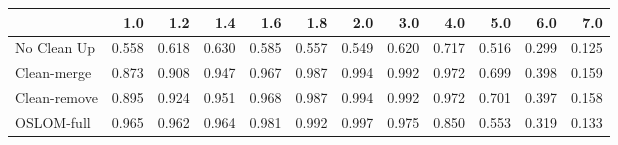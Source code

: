 \begin{tabular}{lrrrrrrrrrrr}
\toprule
{} &   1.0 &   1.2 &   1.4 &   1.6 &   1.8 &   2.0 &   3.0 &   4.0 &   5.0 &   6.0 &   7.0 \\
\midrule
No Clean Up  & 0.558 & 0.618 & 0.630 & 0.585 & 0.557 & 0.549 & 0.620 & 0.717 & 0.516 & 0.299 & 0.125 \\
Clean-merge  & 0.873 & 0.908 & 0.947 & 0.967 & 0.987 & 0.994 & 0.992 & 0.972 & 0.699 & 0.398 & 0.159 \\
Clean-remove & 0.895 & 0.924 & 0.951 & 0.968 & 0.987 & 0.994 & 0.992 & 0.972 & 0.701 & 0.397 & 0.158 \\
OSLOM-full   & 0.965 & 0.962 & 0.964 & 0.981 & 0.992 & 0.997 & 0.975 & 0.850 & 0.553 & 0.319 & 0.133 \\
\bottomrule
\end{tabular}
